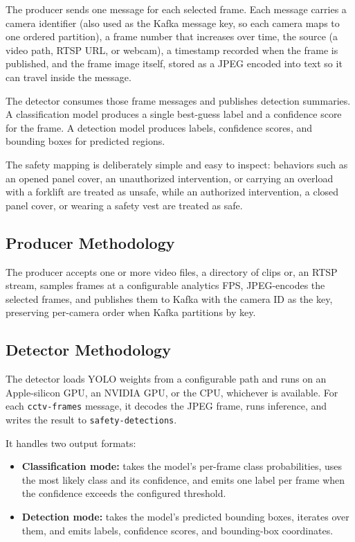 \documentclass[conference]{IEEEtran}
\begin{document}
The producer sends one message for each selected frame. Each message carries a
camera identifier (also used as the Kafka message key, so each camera maps to one
ordered partition), a frame number that increases over time, the source (a video
path, RTSP URL, or webcam), a timestamp recorded when the frame is published, and
the frame image itself, stored as a JPEG encoded into text so it can travel
inside the message.

The detector consumes those frame messages and publishes detection summaries.
A classification model produces a single best-guess label and a confidence score
for the frame. A detection model produces labels, confidence scores, and bounding
boxes for predicted regions.

The safety mapping is deliberately simple and easy to inspect: behaviors such as
an opened panel cover, an unauthorized intervention, or carrying an overload with
a forklift are treated as unsafe, while an authorized intervention, a closed
panel cover, or wearing a safety vest are treated as safe.

\subsection{Producer Methodology}
The producer accepts one or more video files, a directory of clips or, an RTSP stream, samples frames at a configurable analytics FPS, JPEG-encodes the selected frames, and publishes them to Kafka with the camera ID as the key, preserving per-camera order when Kafka partitions by key.

\subsection{Detector Methodology}

The detector loads YOLO weights from a configurable path and runs on an
Apple-silicon GPU, an NVIDIA GPU, or the CPU, whichever is available. For each
\texttt{cctv-frames} message, it decodes the JPEG frame, runs inference, and
writes the result to \texttt{safety-detections}.

It handles two output formats:

\begin{itemize}
    \item \textbf{Classification mode:} takes the model's per-frame class
    probabilities, uses the most likely class and its confidence, and emits one
    label per frame when the confidence exceeds the configured threshold.

    \item \textbf{Detection mode:} takes the model's predicted bounding boxes,
    iterates over them, and emits labels, confidence scores, and bounding-box
    coordinates.
\end{itemize}
\end{document}

